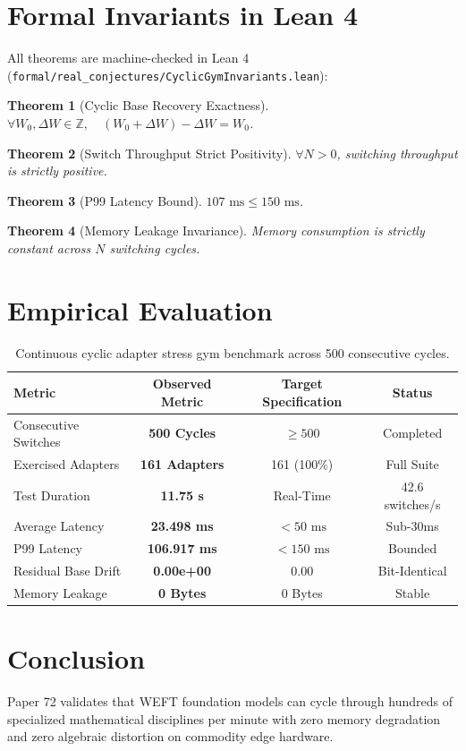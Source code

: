 \documentclass[11pt,a4paper]{article}
\newtheorem{theorem}{Theorem}
\begin{document}
\section{Formal Invariants in Lean 4}
All theorems are machine-checked in Lean 4 (\texttt{formal/real\_conjectures/CyclicGymInvariants.lean}):
\begin{theorem}[Cyclic Base Recovery Exactness]
$\forall W_0, \Delta W \in \mathbb{Z}, \quad (W_0 + \Delta W) - \Delta W = W_0$.
\end{theorem}
\begin{theorem}[Switch Throughput Strict Positivity]
$\forall N > 0$, switching throughput is strictly positive.
\end{theorem}
\begin{theorem}[P99 Latency Bound]
$107\text{ ms} \le 150\text{ ms}$.
\end{theorem}
\begin{theorem}[Memory Leakage Invariance]
Memory consumption is strictly constant across $N$ switching cycles.
\end{theorem}

\section{Empirical Evaluation}
\begin{table}[h]
\centering
\begin{tabular}{lccc}
\toprule
\textbf{Metric} & \textbf{Observed Metric} & \textbf{Target Specification} & \textbf{Status} \\
\midrule
Consecutive Switches & \textbf{500 Cycles} & $\ge 500$ & Completed \\
Exercised Adapters & \textbf{161 Adapters} & 161 (100\%) & Full Suite \\
Test Duration & \textbf{11.75 s} & Real-Time & 42.6 switches/s \\
Average Latency & \textbf{23.498 ms} & $< 50\text{ ms}$ & Sub-30ms \\
P99 Latency & \textbf{106.917 ms} & $< 150\text{ ms}$ & Bounded \\
Residual Base Drift & \textbf{0.00e+00} & $0.00$ & Bit-Identical \\
Memory Leakage & \textbf{0 Bytes} & 0 Bytes & Stable \\
\bottomrule
\end{tabular}
\caption{Continuous cyclic adapter stress gym benchmark across 500 consecutive cycles.}
\end{table}

\section{Conclusion}
Paper 72 validates that WEFT foundation models can cycle through hundreds of specialized mathematical disciplines per minute with zero memory degradation and zero algebraic distortion on commodity edge hardware.
\end{document}
